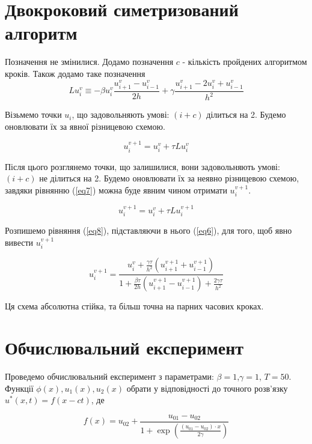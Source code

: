 \documentclass[a4paper,12pt]{article}
\begin{document}
\section{Двокроковий симетризований алгоритм}

Позначення не змінилися. Додамо позначення $c$ - кількість пройдених алгоритмом кроків. Також додамо таке позначення
\begin{equation} \label{eq6}
		L u_{i}^{v} \equiv - \beta u_{i}^{v} \frac{u_{i+1}^{v} - u_{i-1}^{v}}{2h} + \gamma \frac{u_{i+1}^{v} - 2u_{i}^{v} +u_{i-1}^{v}}{h^2}
\end{equation}

Візьмемо точки $u_{i}$, що задовольняють умові: $(i+c)$ ділиться на 2. Будемо оновлювати їх за явної різницевою схемою.

\begin{equation} \label{eq7}
	u_i^{v+1}= u_i^{v} + \tau Lu_{i}^{v}
\end{equation}

Після цього розглянемо точки, що залишилися, вони задовольняють умові: $(i+c)$ не ділиться на 2. Будемо оновлювати їх за неявно різницевою схемою, завдяки рівнянню (\ref{eq7}) можна буде явним чином отримати $u_{i}^{v+1}$.

\begin{equation} \label{eq8}
u_i^{v+1}= u_i^{v} + \tau Lu_{i}^{v+1}
\end{equation}

Розпишемо рівняння (\ref{eq8}), підставляючи в нього (\ref{eq6}), для того, щоб явно вивести $u_i^{v+1}$

\begin{equation} \label{eq9}
	u^{v+1}_{i} = \frac{u_i^v + \frac{\gamma \tau}{h^2} \left( u^{v+1}_{i+1} + u^{v+1}_{i-1} \right) }{1 + \frac{\beta \tau}{2h} \left( u^{v+1}_{i+1} - u^{v+1}_{i-1} \right) + \frac{2 \gamma \tau}{h^2} }
\end{equation}

Ця схема абсолютна стійка, та більш точна на парних часових кроках.

\section{Обчислювальний експеримент}

Проведемо обчислювальний експеримент з параметрами: $\beta = 1$,$\gamma=1$, $T = 50$. Функції $\phi(x), u_1(x), u_2(x)$ обрати у відповідності до точного розв'язку $u^*(x,t) = f(x - ct)$, де 

\begin{equation} \label{eq10}
	f(x) = u_{02} + \frac{u_{01} - u_{02}}{1 + \exp\left(\frac{(u_{01}-u_{02})\cdot x }{2\gamma} \right)}
\end{equation}
\end{document}

